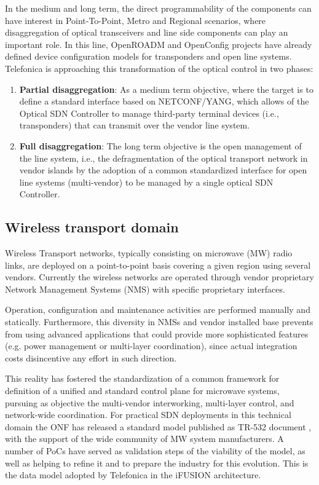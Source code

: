 \documentclass[a4paper,fleqn]{cas-dc}
\begin{document}
In the medium and long term, the direct programmability of the components can have interest in Point-To-Point, Metro and Regional scenarios, where disaggregation of optical transceivers and line side components can play an important role. In this line, OpenROADM \cite{oda2016learning,kundrat2019opening} and OpenConfig \cite{shaikhopenconfig} projects have already defined device configuration models for transponders and open line systems. Telefonica is approaching this transformation of the optical control in two phases:

\begin{enumerate}
    \item \textbf{Partial disaggregation}: As a medium term objective, where the target is to define a standard interface based on NETCONF/YANG, which allows of the Optical SDN Controller to manage third-party terminal devices (i.e., transponders) that can transmit over the vendor line system.
    
    \item \textbf{Full disaggregation}: The long term objective is the open management of the line system, i.e., the defragmentation of the optical transport network in vendor islands by the adoption of a common standardized interface for open line systems (multi-vendor) to be managed by a single optical SDN Controller.
\end{enumerate}

\subsection{Wireless transport domain}
\label{section:mw}
Wireless Transport networks, typically consisting on microwave (MW) radio links, are deployed on a point-to-point basis covering a given region using several vendors. Currently the wireless networks are operated through vendor proprietary Network Management Systems (NMS) with specific proprietary interfaces.

Operation, configuration and maintenance activities are performed manually and statically. Furthermore, this diversity in NMSs and vendor installed base prevents from using advanced applications that could provide more sophisticated features (e.g. power management or multi-layer coordination), since actual integration costs disincentive any effort in such direction. 

This reality has fostered the standardization of a common framework for definition of a unified and standard control plane for microwave systems, pursuing as objective the multi-vendor interworking, multi-layer control, and network-wide coordination.
For practical SDN deployments in this technical domain the ONF has released a standard model published as TR-532 document \cite{tr2016532}, with the support of the wide community of MW system manufacturers. A number of PoCs have served as validation steps of the viability of the model, as well as helping to refine it and to prepare the industry for this evolution. This is the data model adopted by Telefonica in the iFUSION architecture.
\end{document}

